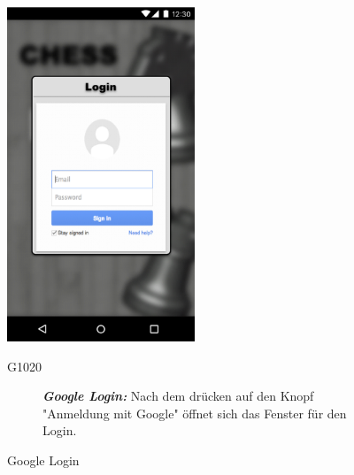 \documentclass[parskip=full]{scrartcl}
\begin{document}
\begin{figure}[htp]
	\begin{minipage}[t]{6cm}
		\vspace{0pt}
		\includegraphics[height=100mm]{google_login.png}
		\caption{Google Login}
		\label{fig:Google Login}
	\end{minipage}
	\hfill
	\begin{minipage}[t]{6cm}
		\vspace{0pt}
		\begin{description}
			\item[G1020] \textbf{\textit{Google Login: }} Nach dem drücken auf den Knopf "Anmeldung mit Google" öffnet sich das Fenster für den Login.
		\end{description}
	\end{minipage}
\end{figure}
\end{document}
